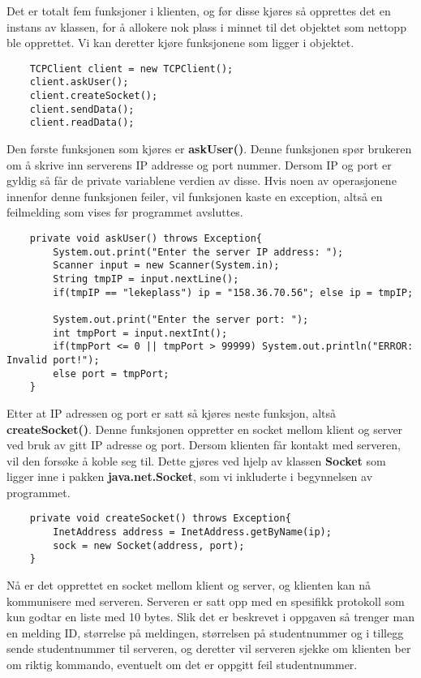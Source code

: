 Det er totalt fem funksjoner i klienten, og før disse kjøres så opprettes det en instans av klassen, for å allokere nok plass i minnet til det objektet som nettopp ble opprettet. Vi kan deretter kjøre funksjonene som ligger i objektet.
\begin{lstlisting}
	TCPClient client = new TCPClient();
	client.askUser();
	client.createSocket();
	client.sendData();
	client.readData();
\end{lstlisting}

Den første funksjonen som kjøres er \textbf{askUser()}. Denne funksjonen spør brukeren om å skrive inn serverens IP addresse og port nummer. Dersom IP og port er gyldig så får de private variablene verdien av disse. Hvis noen av operasjonene innenfor denne funksjonen feiler, vil funksjonen kaste en exception, altså en feilmelding som vises før programmet avsluttes.
\begin{lstlisting}
	private void askUser() throws Exception{
		System.out.print("Enter the server IP address: ");
		Scanner input = new Scanner(System.in);
		String tmpIP = input.nextLine();
		if(tmpIP == "lekeplass") ip = "158.36.70.56"; else ip = tmpIP;

		System.out.print("Enter the server port: ");
		int tmpPort = input.nextInt();
		if(tmpPort <= 0 || tmpPort > 99999) System.out.println("ERROR: Invalid port!");
		else port = tmpPort;
	}
\end{lstlisting}

Etter at IP adressen og port er satt så kjøres neste funksjon, altså \textbf{createSocket()}. Denne funksjonen oppretter en socket mellom klient og server ved bruk av gitt IP adresse og port. Dersom klienten får kontakt med serveren, vil den forsøke å koble seg til. Dette gjøres ved hjelp av klassen \textbf{Socket} som ligger inne i pakken \textbf{java.net.Socket}, som vi inkluderte i begynnelsen av programmet.
\begin{lstlisting}
	private void createSocket() throws Exception{
		InetAddress address = InetAddress.getByName(ip);
		sock = new Socket(address, port);
	}
\end{lstlisting}

Nå er det opprettet en socket mellom klient og server, og klienten kan nå kommunisere med serveren. Serveren er satt opp med en spesifikk protokoll som kun godtar en liste med 10 bytes. Slik det er beskrevet i oppgaven så trenger man en melding ID, størrelse på meldingen, størrelsen på studentnummer og i tillegg sende studentnummer til serveren, og deretter vil serveren sjekke om klienten ber om riktig kommando, eventuelt om det er oppgitt feil studentnummer.\\

